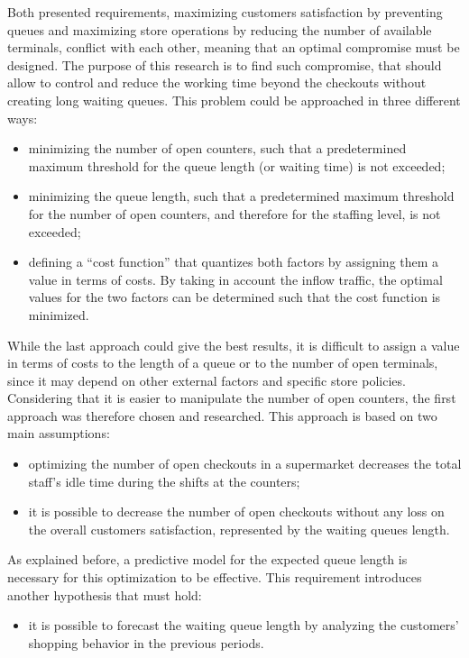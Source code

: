 Both presented requirements, maximizing customers satisfaction by preventing queues and maximizing store operations by reducing the number of available terminals, conflict with each other, meaning that an optimal compromise must be designed. The purpose of this research is to find such compromise, that should allow to control and reduce the working time beyond the checkouts without creating long waiting queues. This problem could be approached in three different ways:
\begin{itemize}
  \item minimizing the number of open counters, such that a predetermined maximum threshold for the queue length (or waiting time) is not exceeded;
  \item minimizing the queue length, such that a predetermined maximum threshold for the number of open counters, and therefore for the staffing level, is not exceeded;
  \item defining a “cost function” that quantizes both factors by assigning them a value in terms of costs. By taking in account the inflow traffic, the optimal values for the two factors can be determined such that the cost function is minimized.
\end{itemize}

While the last approach could give the best results, it is difficult to assign a value in terms of costs to the length of a queue or to the number of open terminals, since it may depend on other external factors and specific store policies. Considering that it is easier to manipulate the number of open counters, the first approach was therefore chosen and researched. This approach is based on two main assumptions:
\begin{itemize}
  \item optimizing the number of open checkouts in a supermarket decreases the total staff’s idle time during the shifts at the counters;
  \item it is possible to decrease the number of open checkouts without any loss on the overall customers satisfaction, represented by the waiting queues length.
\end{itemize}

As explained before, a predictive model for the expected queue length is necessary for this optimization to be effective. This requirement introduces another hypothesis that must hold:
\begin{itemize}
  \item it is possible to forecast the waiting queue length by analyzing the customers’ shopping behavior in the previous periods.
\end{itemize}

